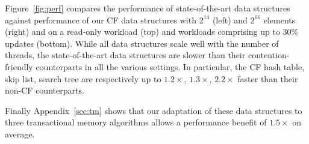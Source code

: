 Figure~\ref{fig:perf} compares the performance of state-of-the-art data structures against performance of our CF data structures with $2^{14}$ (left) and $2^{16}$ elements (right) and on a read-only workload (top) and workloads comprising up to 30\% updates (bottom). While all data structures scale well with the number of threads, the state-of-the-art data structures are slower than their contention-friendly counterparts in all the various settings. In particular, the CF hash table, skip list, search tree are respectively up to $1.2\times$, $1.3\times$, $2.2\times$ faster than their non-CF counterparts.

Finally Appendix~\ref{sec:tm} shows that our adaptation of these data structures to three transactional memory algorithms allows a performance benefit of $1.5\times$ on average.


